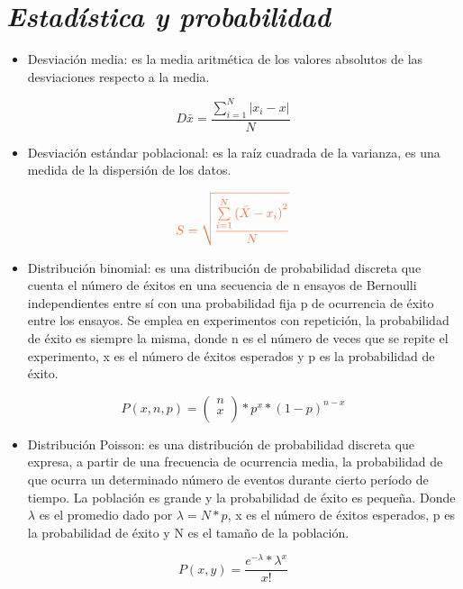 \documentclass[letterpaper,12pt]{article}
\begin{document}
\section{\textit{Estadística y probabilidad}}

    \begin{itemize}
    \item [\ding{41}]
    \small{Desviación media: es la media aritmética de los valores absolutos de las desviaciones respecto a la media.}
    \end{itemize}
    $$D\bar{x}=\frac{\sum\limits_{i=1}^{N}|x_i-x|}{N}$$

    \begin{itemize}
    \item [\ding{171}]
    \small{Desviación estándar poblacional: es la raíz cuadrada de la varianza, es una medida de la dispersión de los datos.}
    \end{itemize}
    \begin{equation*}%
    \textcolor{Orange}{S=\sqrt{\frac{\sum\limits_{i=1}^{N}{(\bar{X}-x_i)}^2}{N}}}
    \end{equation*}

    \begin{itemize}
    \item [\ding{40}]
    \small{Distribución binomial: es una distribución de probabilidad discreta que cuenta el número de éxitos en una secuencia de n ensayos de Bernoulli independientes entre sí con una probabilidad fija p de ocurrencia de éxito entre los ensayos. Se emplea en experimentos con repetición, la probabilidad de éxito es siempre la misma, donde n es el número de veces que se repite el experimento, x es el número de éxitos esperados y p es la probabilidad de éxito.}
    \end{itemize}
    \begin{equation*}%
    P(x,n,p)=
    \begin{pmatrix}
    n\\
    x\\
    \end{pmatrix}*p^x*(1-p)^{n-x}
    \end{equation*}
    
    \begin{itemize}
    \item [\ding{45}]
    \small{Distribución Poisson: es una distribución de probabilidad discreta que expresa, a partir de una frecuencia de ocurrencia media, la probabilidad de que ocurra un determinado número de eventos durante cierto período de tiempo. La población es grande y la probabilidad de éxito es pequeña. Donde $\lambda$ es el promedio dado por $\lambda=N*p$, x es el número de éxitos esperados, p es la probabilidad de éxito y N es el tamaño de la población.}
    \end{itemize}
    \begin{equation*}%
    P(x,y)=\frac{e^{-\lambda}*\lambda^x}{x!}
    \end{equation*}
    
\end{document}
